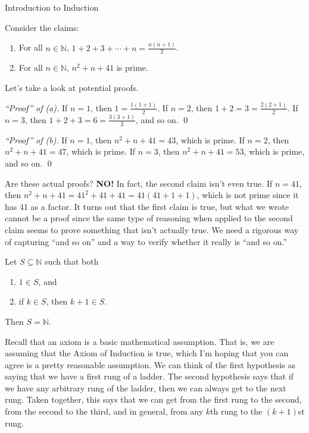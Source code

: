 \begin{section}{Introduction to Induction}

Consider the claims:
\begin{enumerate}[label=\textrm{(\alph*)}]
\item For all $n\in\mathbb{N}$, $\displaystyle 1+2+3+\cdots +n=\frac{n(n+1)}{2}$.
\item For all $n\in\mathbb{N}$, $n^{2}+n+41$ is prime.
\end{enumerate}
Let's take a look at potential proofs.

\bigskip

\noindent \emph{``Proof'' of (a).} If $n=1$, then $1=\frac{1(1+1)}{2}$.  If $n=2$, then $1+2=3=\frac{2(2+1)}{2}$.  If $n=3$, then $1+2+3=6=\frac{3(3+1)}{2}$, and so on. \hfill \qed

\bigskip

\noindent \emph{``Proof'' of (b).} If $n=1$, then $n^{2}+n+41=43$, which is prime.  If $n=2$, then $n^{2}+n+41=47$, which is prime.  If $n=3$, then $n^{2}+n+41=53$, which is prime, and so on. \hfill \qed

\bigskip

Are these actual proofs?  \textbf{NO!}  In fact, the second claim isn't even true.  If $n=41$, then $n^{2}+n+41=41^{2}+41+41=41(41+1+1)$, which is not prime since it has 41 as a factor.  It turns out that the first claim is true, but what we wrote cannot be a proof since the same type of reasoning when applied to the second claim seems to prove something that isn't actually true.  We need a rigorous way of capturing ``and so on'' and a way to verify whether it really is ``and so on.''

\begin{axiom}\label{axiom:induction}
Let $S\subseteq \mathbb{N}$ such that both
\begin{enumerate}[label=\textrm{(\roman*)}]
\item $1\in S$, and
\item if $k\in S$, then $k+1\in S$.
\end{enumerate}
Then $S=\mathbb{N}$.
\end{axiom}

Recall that an axiom is a basic mathematical assumption.  That is, we are assuming that the Axiom of Induction is true, which I'm hoping that you can agree is a pretty reasonable assumption.  We can think of the first hypothesis as saying that we have a first rung of a ladder.  The second hypothesis says that if we have any arbitrary rung of the ladder, then we can always get to the next rung.  Taken together, this says that we can get from the first rung to the second, from the second to the third, and in general, from any $k$th rung to the $(k+1)$st rung.


\end{section}

